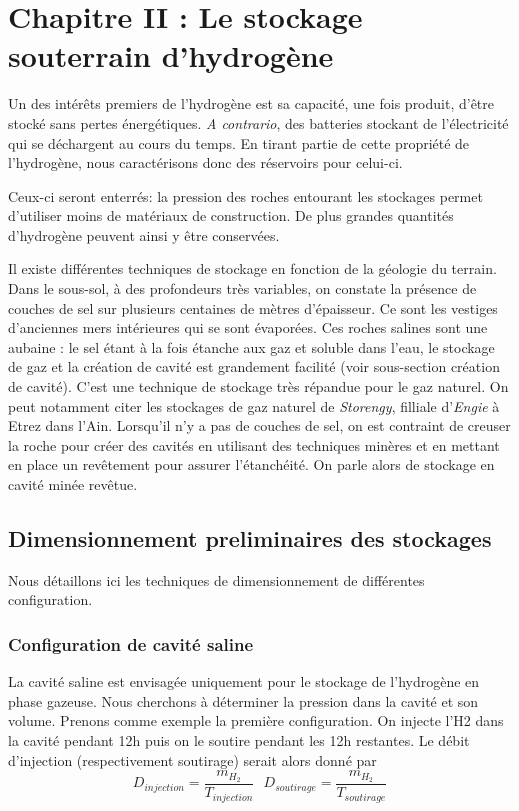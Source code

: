 \documentclass[11pt,french,a4paper]{article}
\begin{document}
\section{Chapitre II : Le stockage souterrain d'hydrogène}
Un des intérêts premiers de l'hydrogène est sa capacité, une fois produit, d'être stocké sans pertes énergétiques. \textit{A contrario}, des batteries stockant de l'électricité qui se déchargent au cours du temps. En tirant partie de cette propriété de l'hydrogène, nous caractérisons donc des réservoirs pour celui-ci. 

Ceux-ci seront enterrés: la pression des roches entourant les stockages permet d'utiliser moins de matériaux de construction. De plus grandes quantités d'hydrogène peuvent ainsi y être conservées.

Il existe différentes techniques de stockage en fonction de la géologie du terrain. Dans le sous-sol, à des profondeurs très variables, on constate la présence de couches de sel sur plusieurs centaines de mètres d'épaisseur. Ce sont les vestiges d'anciennes mers intérieures qui se sont évaporées. Ces roches salines sont une aubaine : le sel étant à la fois étanche aux gaz et soluble dans l'eau, le stockage de gaz et la création de cavité est grandement facilité (voir sous-section création de cavité). C'est une technique de stockage très répandue pour le gaz naturel. On peut notamment citer les stockages de gaz naturel de \emph{Storengy}, filliale d'\emph{Engie} à Etrez dans l'Ain. Lorsqu'il n'y a pas de couches de sel, on est contraint de creuser la roche pour créer des cavités en utilisant des techniques minères et en mettant en place un revêtement pour assurer l'étanchéité. On parle alors de stockage en cavité minée revêtue.


\subsection{Dimensionnement preliminaires des stockages}
Nous détaillons ici les techniques de dimensionnement de différentes configuration.
\subsubsection{Configuration de cavité saline}
La cavité saline est envisagée uniquement pour le stockage de l'hydrogène en phase gazeuse. Nous cherchons à déterminer la pression dans la cavité et son volume. Prenons comme exemple la première configuration. On injecte l’H2 dans la cavité pendant 12h puis on le soutire pendant les 12h restantes. Le débit d’injection (respectivement soutirage) serait alors donné par $$ D_{injection}=\frac{m_{H_2}}{T_{injection}} \ \ \  D_{soutirage}=\frac{m_{H_2}}{T_{soutirage}} $$
\end{document}
